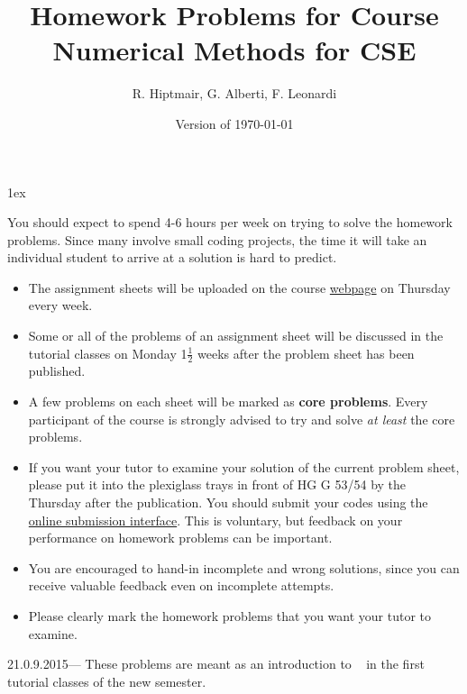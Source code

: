 \documentclass[12pt,oneside]{article}
\author{R. Hiptmair, G. Alberti, F. Leonardi}
\title{Homework Problems for Course\\
  Numerical Methods for CSE}
\date{Version of \today}
\newcommand{\problems}{../Problems}
\theoremstyle{definition}
\begin{document}
\maketitle

\fboxsep1ex
\bigskip

You should expect to spend 4-6 hours per week on trying to solve the homework
problems. Since many involve small coding projects, the time it will take an
individual student to arrive at a solution is hard to predict.  
\bigskip

\begin{itemize}
\item The assignment sheets will be uploaded on the course
  \href{http://www2.math.ethz.ch/education/bachelor/lectures/hs2015/math/nummath_cse/index}{webpage}
  on Thursday every week.
\item Some or all of the problems of an assignment sheet will be discussed in the
  tutorial classes on Monday 1$\frac{1}{2}$ weeks after the problem sheet has been
  published.
\item A few problems on each sheet will be marked as {\bf core problems}. 
  Every participant of the course is strongly advised to try and solve \emph{at least}
  the core problems. 
\item If you want your tutor to examine your solution of the current problem
  sheet, please put it into the plexiglass trays in front of HG G 53/54 by the
  Thursday after the publication. You should submit your codes using the
  \href{https://people.math.ethz.ch/~grsam/submit/}{online submission
    interface}. This is voluntary, but feedback on your performance on homework
  problems can be important.
\item You are encouraged to hand-in incomplete and wrong solutions, since 
  you can receive valuable feedback even on incomplete attempts.
\item Please clearly mark the homework problems that you want your tutor to
  examine.
\end{itemize}

\setcounter{tocdepth}{2}

\begin{sheet}{0}{21.0.9.2015}{---}
These problems are meant as an introduction to \eigen~ in the first
tutorial classes of the new semester.



\end{sheet}
\end{document}
